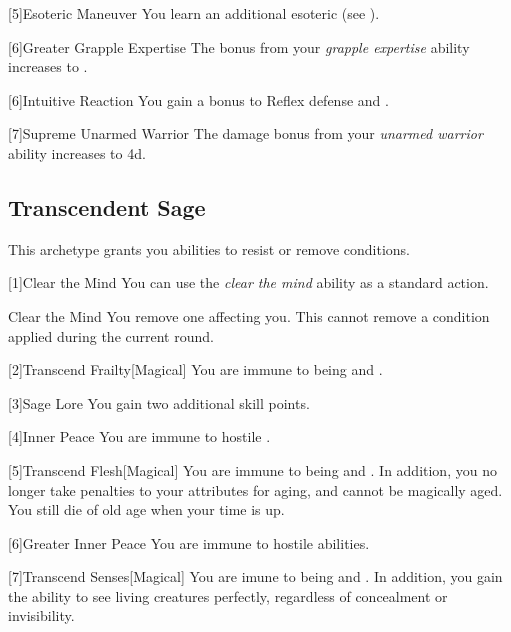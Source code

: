         [5]{Esoteric Maneuver} You learn an additional esoteric  (see ).

        [6]{Greater Grapple Expertise}
        The bonus from your \textit{grapple expertise} ability increases to .

        [6]{Intuitive Reaction}
        You gain a  bonus to Reflex defense and .

        [7]{Supreme Unarmed Warrior} The damage bonus from your \textit{unarmed warrior} ability increases to \plus4d.

    \subsection{Transcendent Sage}
        This archetype grants you abilities to resist or remove conditions.

        [1]{Clear the Mind} You can use the \textit{clear the mind} ability as a standard action.
        \begin{freeability}{Clear the Mind}
            You remove one  affecting you.
            This cannot remove a condition applied during the current round.
        \end{freeability}

        [2]{Transcend Frailty}[Magical]
        You are immune to being  and .

        [3]{Sage Lore} You gain two additional skill points.

        [4]{Inner Peace} You are immune to hostile  .

        [5]{Transcend Flesh}[Magical]
        You are immune to being  and .
        In addition, you no longer take penalties to your attributes for aging, and cannot be magically aged.
        You still die of old age when your time is up.

        [6]{Greater Inner Peace}
        You are immune to hostile  abilities.

        [7]{Transcend Senses}[Magical]
        You are imune to being  and .
        In addition, you gain the ability to see living creatures perfectly, regardless of concealment or invisibility.

